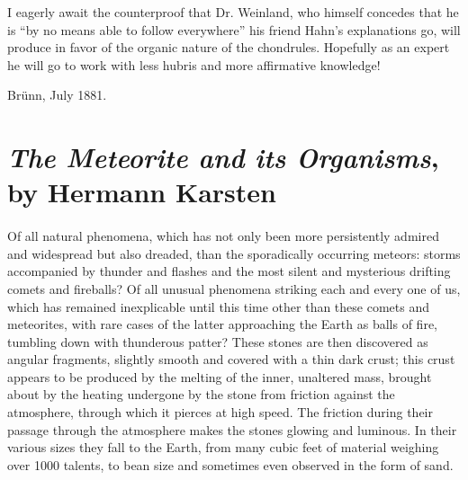 \documentclass[a4paper, 12pt, oneside]{article}
\begin{document}
I eagerly await the counterproof that Dr. Weinland, who himself concedes that he is ``by no means able to follow everywhere'' his friend Hahn's explanations go, will produce in favor of the organic nature of the chondrules. Hopefully as an expert he will go to work with less hubris and more affirmative knowledge!

Brünn, July 1881.
\clearpage
\section{\emph{The Meteorite and its Organisms}, by Hermann Karsten}
\paragraph*{}
Of all natural phenomena, which has not only been more persistently admired and widespread but also dreaded, than the sporadically occurring meteors: storms accompanied by thunder and flashes and the most silent and mysterious drifting comets and fireballs? Of all unusual phenomena striking each and every one of us, which has remained inexplicable until this time other than these comets and meteorites, with rare cases of the latter approaching the Earth as balls of fire, tumbling down with thunderous patter? These stones are then discovered as angular fragments, slightly smooth and covered with a thin dark crust; this crust appears to be produced by the melting of the inner, unaltered mass, brought about by the heating undergone by the stone from friction against the atmosphere, through which it pierces at high speed. The friction during their passage through the atmosphere makes the stones glowing and luminous. In their various sizes they fall to the Earth, from many cubic feet of material weighing over 1000 talents, to bean size and sometimes even observed in the form of sand.
\end{document}
